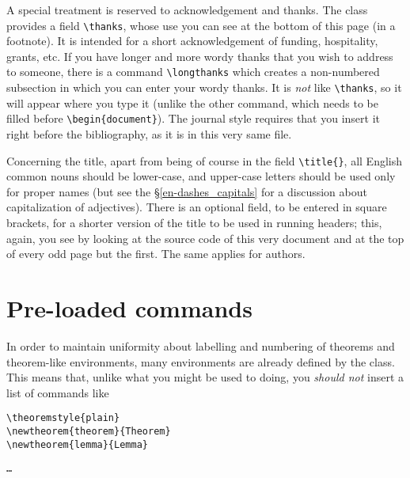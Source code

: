 \documentclass[IGT,Unicode]{cedram}
\begin{document}
A special treatment is reserved to acknowledgement and thanks. The
class provides a field \verb|\thanks|, whose use you can see at the
bottom of this page (in a footnote). It is intended for a short
acknowledgement of funding, hospitality, grants, etc. If you have
longer and more wordy thanks that you wish to address to someone,
there is a command \verb|\longthanks| which creates a non-numbered
subsection in which you can enter your wordy thanks. It is \emph{not}
like \verb|\thanks|, so it will appear where you type it (unlike the
other command, which needs to be filled before
\verb|\begin{document}|). The journal style requires that you insert
it right before the bibliography, as it is in this very same file.


Concerning the title, apart from being of course in the field
\verb|\title{}|, all English common nouns should be lower-case, and
upper-case letters should be used only for proper names (but see the
\S \ref{en-dashes_capitals} for a discussion about capitalization of
adjectives). There is an optional field, to be entered in square
brackets, for a shorter version of the title to be used in running
headers; this, again, you see by looking at the source code of this
very document and at the top of every odd page but the first. The same
applies for authors.

\section{Pre-loaded commands}

In order to maintain uniformity about labelling and numbering of
theorems and theorem-like environments, many environments are already
defined by the class. This means that, unlike what you might be used
to doing, you \emph{should not} insert a list of commands like
\begin{verbatim}
\theoremstyle{plain}
\newtheorem{theorem}{Theorem}
\newtheorem{lemma}{Lemma}
\end{verbatim}
\texttt{\dots}
\end{document}
